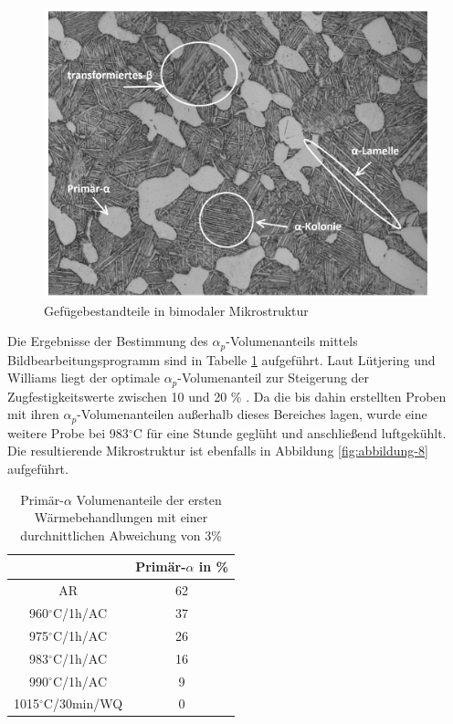 \begin{figure}[h]
	\centering
	\includegraphics[width=0.9\linewidth]{./Bilder/Abbildung 20}
	\caption[Abbildung 20]{Gefügebestandteile in bimodaler Mikrostruktur}
	\label{fig:abbildung-20}
\end{figure}

Die Ergebnisse der Bestimmung des $\alpha_p$-Volumenanteils mittels Bildbearbeitungsprogramm sind in Tabelle \ref{Tabelle 4} aufgeführt. Laut Lütjering und Williams liegt der optimale $\alpha_p$-Volumenanteil zur Steigerung der Zugfestigkeitswerte zwischen 10 und 20 \% \cite{Lutjering.2007}. Da die bis dahin erstellten Proben mit ihren $\alpha_p$-Volumenanteilen außerhalb dieses Bereiches lagen, wurde eine weitere Probe bei 983$^\circ$C für eine Stunde geglüht und anschließend luftgekühlt. Die resultierende Mikrostruktur ist ebenfalls in Abbildung \ref{fig:abbildung-8} aufgeführt.

\begin{table}[h]
	\centering
	\begin{tabular}{|c|c|}
		\hline 
		& Primär-$\alpha$ in \% \\ 
		\hline 
		AR & 62 \\ 
		\hline 
		960$^\circ$C/1h/AC & 37 \\ 
		\hline 
		975$^\circ$C/1h/AC & 26 \\ 
		\hline 
		983$^\circ$C/1h/AC & 16 \\ 
		\hline 
		990$^\circ$C/1h/AC & 9 \\ 
		\hline 
		1015$^\circ$C/30min/WQ & 0 \\ 
		\hline 
	\end{tabular} 
	\caption{Primär-$\alpha$ Volumenanteile der ersten Wärmebehandlungen mit einer durchnittlichen Abweichung von 3\%}
	\label{Tabelle 4}
\end{table}

